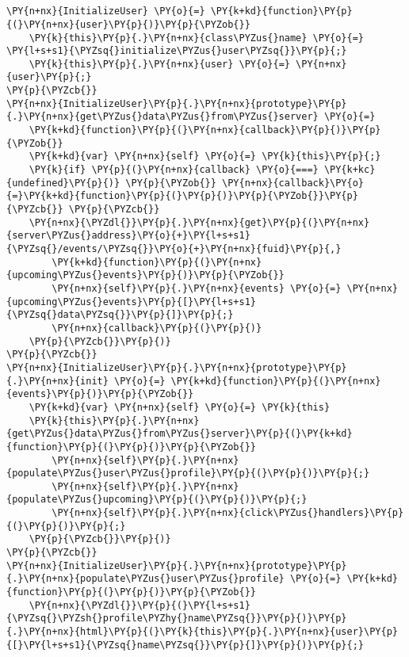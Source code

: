 \section*{}

\begin{Verbatim}[commandchars=\\\{\}]
\PY{n+nx}{InitializeUser} \PY{o}{=} \PY{k+kd}{function}\PY{p}{(}\PY{n+nx}{user}\PY{p}{)}\PY{p}{\PYZob{}}
    \PY{k}{this}\PY{p}{.}\PY{n+nx}{class\PYZus{}name} \PY{o}{=} \PY{l+s+s1}{\PYZsq{}initialize\PYZus{}user\PYZsq{}}\PY{p}{;}
    \PY{k}{this}\PY{p}{.}\PY{n+nx}{user} \PY{o}{=} \PY{n+nx}{user}\PY{p}{;}
\PY{p}{\PYZcb{}}
\PY{n+nx}{InitializeUser}\PY{p}{.}\PY{n+nx}{prototype}\PY{p}{.}\PY{n+nx}{get\PYZus{}data\PYZus{}from\PYZus{}server} \PY{o}{=}
    \PY{k+kd}{function}\PY{p}{(}\PY{n+nx}{callback}\PY{p}{)}\PY{p}{\PYZob{}}
    \PY{k+kd}{var} \PY{n+nx}{self} \PY{o}{=} \PY{k}{this}\PY{p}{;}
    \PY{k}{if} \PY{p}{(}\PY{n+nx}{callback} \PY{o}{===} \PY{k+kc}{undefined}\PY{p}{)} \PY{p}{\PYZob{}} \PY{n+nx}{callback}\PY{o}{=}\PY{k+kd}{function}\PY{p}{(}\PY{p}{)}\PY{p}{\PYZob{}}\PY{p}{\PYZcb{}} \PY{p}{\PYZcb{}}
    \PY{n+nx}{\PYZdl{}}\PY{p}{.}\PY{n+nx}{get}\PY{p}{(}\PY{n+nx}{server\PYZus{}address}\PY{o}{+}\PY{l+s+s1}{\PYZsq{}/events/\PYZsq{}}\PY{o}{+}\PY{n+nx}{fuid}\PY{p}{,}
        \PY{k+kd}{function}\PY{p}{(}\PY{n+nx}{upcoming\PYZus{}events}\PY{p}{)}\PY{p}{\PYZob{}}
        \PY{n+nx}{self}\PY{p}{.}\PY{n+nx}{events} \PY{o}{=} \PY{n+nx}{upcoming\PYZus{}events}\PY{p}{[}\PY{l+s+s1}{\PYZsq{}data\PYZsq{}}\PY{p}{]}\PY{p}{;}
        \PY{n+nx}{callback}\PY{p}{(}\PY{p}{)}
    \PY{p}{\PYZcb{}}\PY{p}{)}
\PY{p}{\PYZcb{}}
\PY{n+nx}{InitializeUser}\PY{p}{.}\PY{n+nx}{prototype}\PY{p}{.}\PY{n+nx}{init} \PY{o}{=} \PY{k+kd}{function}\PY{p}{(}\PY{n+nx}{events}\PY{p}{)}\PY{p}{\PYZob{}}
    \PY{k+kd}{var} \PY{n+nx}{self} \PY{o}{=} \PY{k}{this}
    \PY{k}{this}\PY{p}{.}\PY{n+nx}{get\PYZus{}data\PYZus{}from\PYZus{}server}\PY{p}{(}\PY{k+kd}{function}\PY{p}{(}\PY{p}{)}\PY{p}{\PYZob{}}
        \PY{n+nx}{self}\PY{p}{.}\PY{n+nx}{populate\PYZus{}user\PYZus{}profile}\PY{p}{(}\PY{p}{)}\PY{p}{;}
        \PY{n+nx}{self}\PY{p}{.}\PY{n+nx}{populate\PYZus{}upcoming}\PY{p}{(}\PY{p}{)}\PY{p}{;}
        \PY{n+nx}{self}\PY{p}{.}\PY{n+nx}{click\PYZus{}handlers}\PY{p}{(}\PY{p}{)}\PY{p}{;}
    \PY{p}{\PYZcb{}}\PY{p}{)}
\PY{p}{\PYZcb{}}
\PY{n+nx}{InitializeUser}\PY{p}{.}\PY{n+nx}{prototype}\PY{p}{.}\PY{n+nx}{populate\PYZus{}user\PYZus{}profile} \PY{o}{=} \PY{k+kd}{function}\PY{p}{(}\PY{p}{)}\PY{p}{\PYZob{}}
    \PY{n+nx}{\PYZdl{}}\PY{p}{(}\PY{l+s+s1}{\PYZsq{}\PYZsh{}profile\PYZhy{}name\PYZsq{}}\PY{p}{)}\PY{p}{.}\PY{n+nx}{html}\PY{p}{(}\PY{k}{this}\PY{p}{.}\PY{n+nx}{user}\PY{p}{[}\PY{l+s+s1}{\PYZsq{}name\PYZsq{}}\PY{p}{]}\PY{p}{)}\PY{p}{;}

\end{Verbatim}
